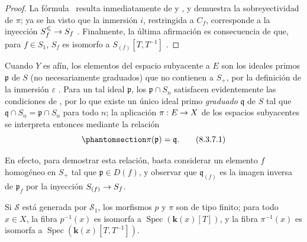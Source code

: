 \documentclass[oneside,10pt]{amsart}
\makeatletter
\renewcommand{\leq}{\leqslant}
\newcommand{\ega@arrow}[2]{\mathchoice{#1}{#2}{#2}{#2}}
\renewcommand{\to}{\ega@arrow{\longrightarrow}{\rightarrow}}
\newcommand{\oldpage}[2][]{\marginnote{\normalfont\footnotesize\textbf{#1}~|~#2}\ignorespaces}
\let\EGAOriginalLabel\label
\renewcommand{\label}[1]{\phantomsection\EGAOriginalLabel{#1}}
\makeatother
\begin{document}
\begin{proof}
La fórmula~ resulta inmediatamente de  y , y demuestra la sobreyectividad de $\pi$;
ya se ha visto que la inmersión $i$, restringida a $C_f$, corresponde
\oldpage[II]{166}
a la inyección $S_f^{\leq}\to S_f$ .
Finalmente, la última afirmación es consecuencia de que, para $f\in S_1$, $S_f$ es isomorfo a $S_{(f)}[T,T^{-1}]$ .
\end{proof}
\begin{remark}[8.3.7]
\label{II.8.3.7-fr}
Cuando $Y$ es afín, los elementos del espacio subyacente a $E$ son los ideales primos $\mathfrak{p}$ de $S$ (no necesariamente graduados) que no contienen a $S_+$, por la definición de la inmersión $\varepsilon$ .
Para un tal ideal $\mathfrak{p}$, los $\mathfrak{p}\cap S_n$ satisfacen evidentemente las condiciones de , por lo que existe un único ideal primo \emph{graduado} $\mathfrak{q}$ de $S$ tal que $\mathfrak{q}\cap S_n=\mathfrak{p}\cap S_n$ para todo $n$;
la aplicación $\pi:E\to X$ de los espacios subyacentes se interpreta entonces mediante la relación
\begin{equation}
\label{II.8.3.7.1-fr}
  \pi(\mathfrak{p})=\mathfrak{q}.
\tag{8.3.7.1}
\end{equation}

En efecto, para demostrar esta relación, basta considerar un elemento $f$ homogéneo en $S_+$ tal que $\mathfrak{p}\in D(f)$, y observar que $\mathfrak{q}_{(f)}$ es la imagen inversa de $\mathfrak{p}_f$ por la inyección $S_{(f)}\to S_f$.
\end{remark}

\begin{corollary}[8.3.8]
\label{II.8.3.8-fr}
Si $\mathcal{S}$ está generada por $\mathcal{S}_1$, los morfismos $p$ y $\pi$ son de tipo finito;
para todo $x\in X$, la fibra $p^{-1}(x)$ es isomorfa a $\operatorname{Spec}(\boldsymbol{k}(x)[T])$, y la fibra $\pi^{-1}(x)$ es isomorfa a $\operatorname{Spec}(\boldsymbol{k}(x)[T,T^{-1}])$.
\end{corollary}
\end{document}
